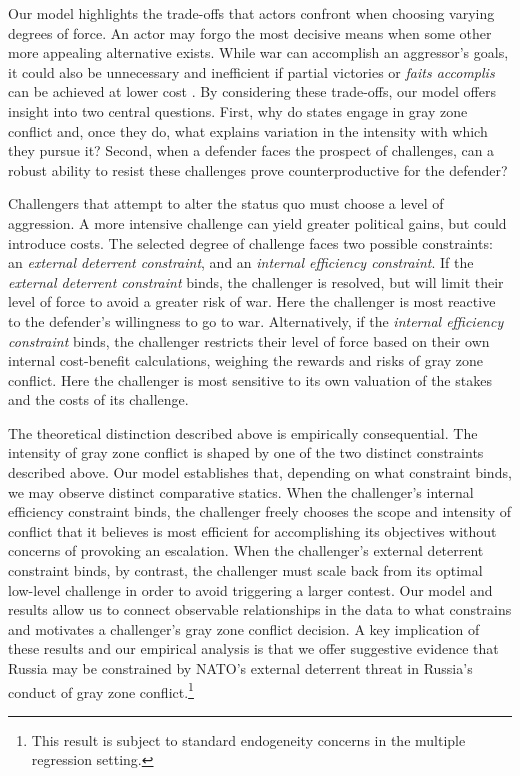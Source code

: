 \documentclass[11pt,letterpaper,pdftex,dvipsnames,table]{article}
\begin{document}
Our model highlights the trade-offs that actors confront when choosing varying degrees of force. An actor may forgo the most decisive means when some other more appealing alternative exists. While war can accomplish an aggressor’s goals, it could also be unnecessary and inefficient if partial victories or \textit{faits accomplis} can be achieved at lower cost \citep{tarar_strategiclogicmilitary_2016, altman_advancingattackingstrategic_2018}. By considering these trade-offs, our model offers insight into two central questions. First, why do states engage in gray zone conflict and, once they do, what explains variation in the intensity with which they pursue it? Second, when a defender faces the prospect of challenges, can a robust ability to resist these challenges prove counterproductive for the defender?

Challengers that attempt to alter the status quo must choose a level of aggression. A more intensive challenge can yield greater political gains, but could introduce costs. The selected degree of challenge faces two possible constraints: an \textit{external deterrent constraint}, and an \textit{internal efficiency constraint}. If the \textit{external deterrent constraint} binds, the challenger is resolved, but will limit their level of force to avoid a greater risk of war. Here the challenger is most reactive to the defender's willingness to go to war. Alternatively, if the \textit{internal efficiency constraint} binds, the challenger restricts their level of force based on their own internal cost-benefit calculations, weighing the rewards and risks of gray zone conflict. Here the challenger is most sensitive to its own valuation of the stakes and the costs of its challenge.

The theoretical distinction described above is empirically consequential. The intensity of gray zone conflict is shaped by one of the two distinct constraints described above. Our model establishes that, depending on what constraint binds, we may observe distinct comparative statics. When the challenger's internal efficiency constraint binds, the challenger freely chooses the scope and intensity of conflict that it believes is most efficient for accomplishing its objectives without concerns of provoking an escalation. When the challenger's external deterrent constraint binds, by contrast, the challenger must scale back from its optimal low-level challenge in order to avoid triggering a larger contest. Our model and results allow us to connect observable relationships in the data to what constrains and motivates a challenger's gray zone conflict decision. A key implication of these results and our empirical analysis is that we offer suggestive evidence that Russia may be constrained by NATO's external deterrent threat in Russia's conduct of gray zone conflict.\footnote{This result is subject to standard endogeneity concerns in the multiple regression setting.}
\end{document}
